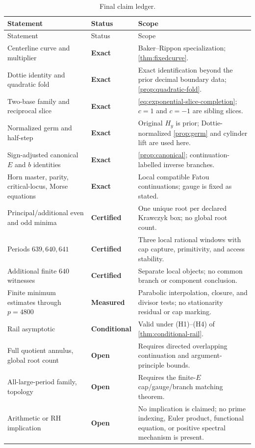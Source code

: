 \documentclass[11pt]{article}
\theoremstyle{definition}
\theoremstyle{remark}
\newcommand{\status}[1]{\textsf{\textbf{#1}}}
\begin{document}
\begin{longtable}{@{}>{\raggedright\arraybackslash}p{}>{\raggedright\arraybackslash}p{}>{\raggedright\arraybackslash}p{}@{}}
\caption{Final claim ledger.}\label{tab:claim-ledger}\\
\toprule
Statement & Status & Scope \\
\midrule
\endfirsthead
\toprule
Statement & Status & Scope \\
\midrule
\endhead
Centerline curve and multiplier & \status{Exact} & Baker--Rippon specialization; \cref{thm:fixedcurve}. \\
Dottie identity and quadratic fold & \status{Exact} & Exact identification beyond the prior decimal boundary data; \cref{prop:quadratic-fold}. \\
Two-base family and reciprocal slice & \status{Exact} & \cref{eq:exponential-slice-completion}; $c=1$ and $c=-1$ are sibling slices. \\
Normalized germ and half-step & \status{Exact} & Original $H_y$ is prior; Dottie-normalized \cref{prop:germ} and cylinder lift are used here. \\
Sign-adjusted canonical $E$ and $b$ identities & \status{Exact} & \cref{prop:canonical}; continuation-labelled inverse branches. \\
Horn master, parity, critical-locus, Morse equations & \status{Exact} & Local compatible Fatou continuations; gauge is fixed as stated. \\
Principal/additional even and odd minima & \status{Certified} & One unique root per declared Krawczyk box; no global root count. \\
Periods $639,640,641$ & \status{Certified} & Three local rational windows with cap capture, primitivity, and access stability. \\
Additional finite $640$ witnesses & \status{Certified} & Separate local objects; no common branch or component conclusion. \\
Finite minimum estimates through $p=4800$ & \status{Measured} & Parabolic interpolation, closure, and divisor tests; no stationarity residual or cap marking. \\
Rail asymptotic & \status{Conditional} & Valid under (H1)--(H4) of \cref{thm:conditional-rail}. \\
Full quotient annulus, global root count & \status{Open} & Requires directed overlapping continuation and argument-principle bounds. \\
All-large-period family, topology & \status{Open} & Requires the finite-$E$ cap/gauge/branch matching theorem. \\
Arithmetic or RH implication & \status{Open} & No implication is claimed; no prime indexing, Euler product, functional equation, or positive spectral mechanism is present. \\
\bottomrule
\end{longtable}
\end{document}
